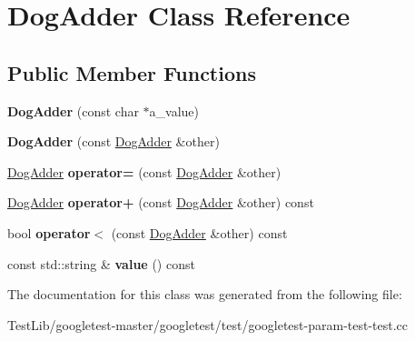 \hypertarget{classDogAdder}{}\section{Dog\+Adder Class Reference}
\label{classDogAdder}
\subsection*{Public Member Functions}
\begin{DoxyCompactItemize}
\item 
\mbox{\label{classDogAdder_a7fd76a2078834dc255c7dd7ac7c58f32}} 
{\bfseries Dog\+Adder} (const char $\ast$a\+\_\+value)
\item 
\mbox{\label{classDogAdder_a35bb24b649b63f38784dcb44d55c4d94}} 
{\bfseries Dog\+Adder} (const \hyperlink{classDogAdder}{Dog\+Adder} \&other)
\item 
\mbox{\label{classDogAdder_a13bd773069c15b083f876b8afd512247}} 
\hyperlink{classDogAdder}{Dog\+Adder} {\bfseries operator=} (const \hyperlink{classDogAdder}{Dog\+Adder} \&other)
\item 
\mbox{\label{classDogAdder_ad667166cdafb4352396e910faf09a55f}} 
\hyperlink{classDogAdder}{Dog\+Adder} {\bfseries operator+} (const \hyperlink{classDogAdder}{Dog\+Adder} \&other) const
\item 
\mbox{\label{classDogAdder_a6d87d3ee06c0167e7552ba83daa629e7}} 
bool {\bfseries operator$<$} (const \hyperlink{classDogAdder}{Dog\+Adder} \&other) const
\item 
\mbox{\label{classDogAdder_a76bb9e42f79e9d4adacd9e48a3a3c9fb}} 
const std\+::string \& {\bfseries value} () const
\end{DoxyCompactItemize}


The documentation for this class was generated from the following file\+:\begin{DoxyCompactItemize}
\item 
Test\+Lib/googletest-\/master/googletest/test/googletest-\/param-\/test-\/test.\+cc\end{DoxyCompactItemize}
